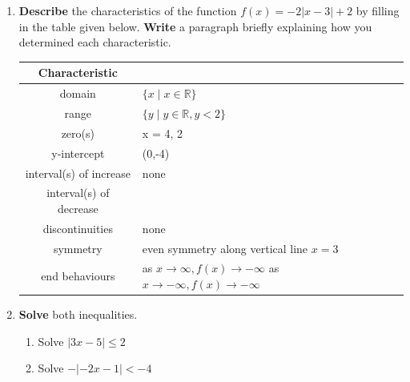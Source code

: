 \documentclass[12pt]{book}
\begin{document}

\begin{enumerate}

\item  \textbf{Describe} the characteristics of the function $f(x) = -2|x-3|+2$ by filling in the table given below. \textbf{Write} a paragraph briefly explaining how you determined each characteristic.\\

\vspace{2.5in}

\renewcommand{\arraystretch}{3}  %
\begin{center}

\begin{tabular}{|c|m{4in}|}
\hline
\textbf{Characteristic} &  \\
\hline
domain & $\{ x \mid x \in \mathbb{R} \}$\\
\hline
range & $\{ y \mid y \in \mathbb{R}, y < 2 \}$\\
\hline
zero(s) & x = 4, 2\\
\hline
y-intercept & (0,-4)\\
\hline
interval(s) of increase & none\\
\hline
interval(s) of decrease & \\
\hline
discontinuities & none\\
\hline
symmetry & even symmetry along vertical line $x=3$\\
\hline
end behaviours & \shortstack[l]{as $x \to \infty, f(x) \to -\infty$ \\ as $x \to -\infty, f(x) \to -\infty$}\\
\hline
\end{tabular}
\end{center}



\newpage

\item \textbf{Solve} both inequalities.

\begin{enumerate}
\item Solve $|3x-5| \le 2$
\item Solve $-|-2x-1| < -4$
\end{enumerate}


\end{enumerate}
\end{document}
